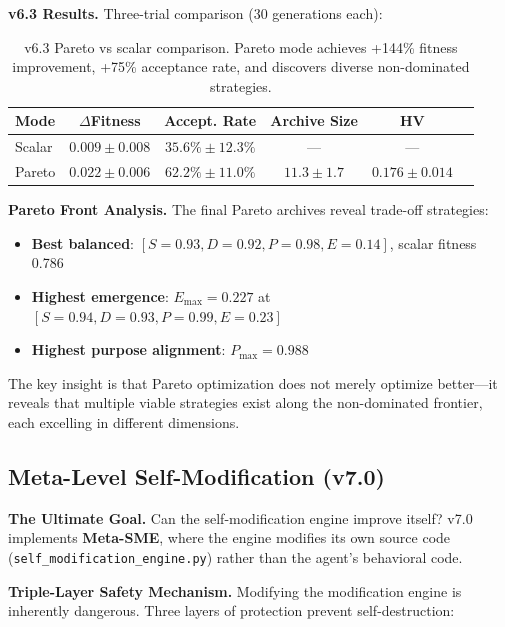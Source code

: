 \documentclass[11pt]{article}
\begin{document}
\textbf{v6.3 Results.} Three-trial comparison (30 generations each):

\begin{table}[h]
\centering
\begin{tabular}{lccccc}
\toprule
\textbf{Mode} & \textbf{$\Delta$Fitness} & \textbf{Accept. Rate} & \textbf{Archive Size} & \textbf{HV} \\
\midrule
Scalar & $0.009 \pm 0.008$ & $35.6\% \pm 12.3\%$ & --- & --- \\
Pareto & $\mathbf{0.022 \pm 0.006}$ & $\mathbf{62.2\% \pm 11.0\%}$ & $11.3 \pm 1.7$ & $0.176 \pm 0.014$ \\
\bottomrule
\end{tabular}
\caption{v6.3 Pareto vs scalar comparison. Pareto mode achieves +144\% fitness improvement, +75\% acceptance rate, and discovers diverse non-dominated strategies.}
\label{tab:v63_results}
\end{table}

\textbf{Pareto Front Analysis.} The final Pareto archives reveal trade-off strategies:
\begin{itemize}
    \item \textbf{Best balanced}: $[S{=}0.93, D{=}0.92, P{=}0.98, E{=}0.14]$, scalar fitness 0.786
    \item \textbf{Highest emergence}: $E_{\max} = 0.227$ at $[S{=}0.94, D{=}0.93, P{=}0.99, E{=}0.23]$
    \item \textbf{Highest purpose alignment}: $P_{\max} = 0.988$
\end{itemize}

The key insight is that Pareto optimization does not merely optimize better---it reveals that multiple viable strategies exist along the non-dominated frontier, each excelling in different dimensions.


\subsection{Meta-Level Self-Modification (v7.0)}

\textbf{The Ultimate Goal.} Can the self-modification engine improve itself? v7.0 implements \textbf{Meta-SME}, where the engine modifies its own source code (\texttt{self\_modification\_engine.py}) rather than the agent's behavioral code.

\textbf{Triple-Layer Safety Mechanism.} Modifying the modification engine is inherently dangerous. Three layers of protection prevent self-destruction:
\end{document}
